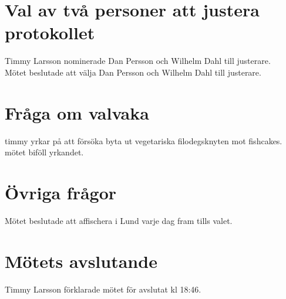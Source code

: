 \documentclass[a4paper,10pt]{article}
\begin{document}
\section{Val av två personer att justera protokollet}
Timmy Larsson nominerade Dan Persson och Wilhelm Dahl till justerare.\\
Mötet beslutade att välja Dan Persson och Wilhelm Dahl till justerare.

\section{Fråga om valvaka}
timmy yrkar på att försöka byta ut vegetariska filodegsknyten mot fishcakes.\\
mötet biföll yrkandet.

\section{Övriga frågor}
Mötet beslutade att affischera i Lund varje dag fram tills valet.

\section{Mötets avslutande}
Timmy Larsson förklarade mötet för avslutat kl 18:46.
\end{document}
